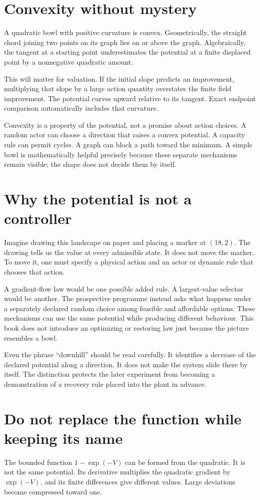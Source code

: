 \section{Convexity without mystery}
A quadratic bowl with positive curvature is convex. Geometrically, the straight chord joining two points on its graph lies on or above the graph. Algebraically, the tangent at a starting point underestimates the potential at a finite displaced point by a nonnegative quadratic amount.

This will matter for valuation. If the initial slope predicts an improvement, multiplying that slope by a large action quantity overstates the finite field improvement. The potential curves upward relative to its tangent. Exact endpoint comparison automatically includes that curvature.

Convexity is a property of the potential, not a promise about action choices. A random actor can choose a direction that raises a convex potential. A capacity rule can permit cycles. A graph can block a path toward the minimum. A simple bowl is mathematically helpful precisely because these separate mechanisms remain visible; the shape does not decide them by itself.

\section{Why the potential is not a controller}
Imagine drawing this landscape on paper and placing a marker at \((18,2)\). The drawing tells us the value at every admissible state. It does not move the marker. To move it, one must specify a physical action and an actor or dynamic rule that chooses that action.

A gradient-flow law would be one possible added rule. A largest-value selector would be another. The prospective programme instead asks what happens under a separately declared random choice among feasible and affordable options. These mechanisms can use the same potential while producing different behaviour. This book does not introduce an optimizing or restoring law just because the picture resembles a bowl.

Even the phrase ``downhill'' should be read carefully. It identifies a decrease of the declared potential along a direction. It does not make the system slide there by itself. The distinction protects the later experiment from becoming a demonstration of a recovery rule placed into the plant in advance.

\section{Do not replace the function while keeping its name}
The bounded function \(1-\exp(-V)\) can be formed from the quadratic. It is not the same potential. Its derivative multiplies the quadratic gradient by \(\exp(-V)\), and its finite differences give different values. Large deviations become compressed toward one.

